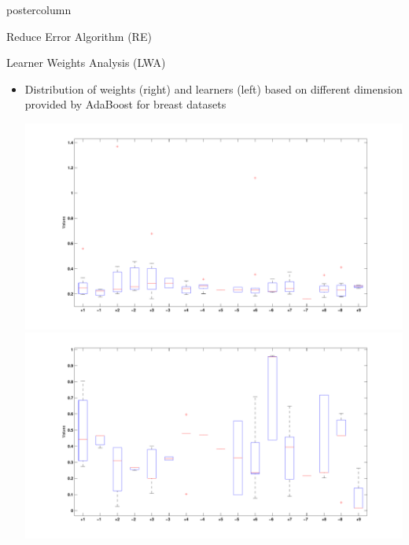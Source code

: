 \documentclass[final]{beamer}
\begin{document}
\begin{frame}
\begin{columns}
\begin{column}{.49\textwidth}
\begin{beamercolorbox}[center,wd=\textwidth]{postercolumn}
\begin{minipage}[T]{.95\textwidth}
{\begin{block}{Reduce Error Algorithm (RE)}
\begin{itemize}
\begin{itemize}
\begin{itemize}
              	\end{itemize}
              	\end{itemize}
              \end{itemize}              
          \end{block}
            \vfill
          \begin{block}{Learner Weights Analysis (LWA)}
            \begin{itemize}
            		\item Distribution of weights (right) and learners (left) based on different dimension provided by AdaBoost for breast datasets
            		\begin{center}
     
              	\includegraphics[width=0.45\linewidth]{images/drifts/breast_weights-eps-converted-to}
              \-
				\includegraphics[width=0.45\linewidth]{images/drifts/breast_threshold-eps-converted-to}
			       

\end{center}
\end{itemize}
\end{block}}
\end{minipage}
\end{beamercolorbox}
\end{column}
\end{columns}
\end{frame}
\end{document}
